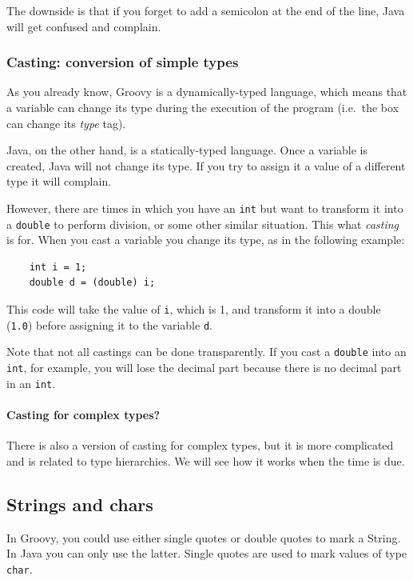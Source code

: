 The downside is that if you forget to add a semicolon at the end of
the line, 
Java will get confused and complain. 


\subsubsection{Casting: conversion of simple types}
\label{sec:cast-conv-simple}

As you already know, Groovy is a dynamically-typed language, which
means that a variable can change its type during the execution of the
program (i.e.~the box can change its \emph{type} tag). 

Java, on the other hand, is a statically-typed language. Once a
variable is created, Java will not change its type. If you try to
assign it a value of a different type it will complain.

However, there are times in which you have an \verb+int+ but want to
transform it into a \verb+double+ to perform division, or some other
similar situation. This what \emph{casting} is for. When you cast a
variable you change its type, as in the following example: 

\begin{verbatim}
    int i = 1;
    double d = (double) i;
\end{verbatim}

This code will take the value of \verb+i+, which is 1, and transform
it into a double (\verb+1.0+) before assigning it to the
variable \verb+d+. 

Note that not all castings can be done transparently. If you cast a
\verb+double+ into an \verb+int+, for example, you will lose the
decimal part because there is no decimal part in an \verb+int+. 

\paragraph{Casting for complex types?}
\label{sec:cast-compl-types}

There is also a version of casting for complex types, but it is more
complicated and is related to type hierarchies. We will see how it
works when the time is due.

\subsection{Strings and chars}
\label{sec:strings-chars}

In Groovy, you could use either single quotes or double quotes to mark
a String. In Java you can only use the latter. Single quotes are used
to mark values of type \verb+char+. 

